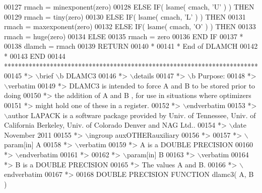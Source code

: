 \begin{DoxyCode}
00127          rmach = minexponent(zero)
00128       \textcolor{keywordflow}{ELSE} \textcolor{keywordflow}{IF}( lsame( cmach, \textcolor{stringliteral}{'U'} ) ) \textcolor{keywordflow}{THEN}
00129          rmach = tiny(zero)
00130       \textcolor{keywordflow}{ELSE} \textcolor{keywordflow}{IF}( lsame( cmach, \textcolor{stringliteral}{'L'} ) ) \textcolor{keywordflow}{THEN}
00131          rmach = maxexponent(zero)
00132       \textcolor{keywordflow}{ELSE} \textcolor{keywordflow}{IF}( lsame( cmach, \textcolor{stringliteral}{'O'} ) ) \textcolor{keywordflow}{THEN}
00133          rmach = huge(zero)
00134       \textcolor{keywordflow}{ELSE}
00135          rmach = zero
00136 \textcolor{keywordflow}{      END IF}
00137 \textcolor{comment}{*}
00138       dlamch = rmach
00139       \textcolor{keywordflow}{RETURN}
00140 \textcolor{comment}{*}
00141 \textcolor{comment}{*     End of DLAMCH}
00142 \textcolor{comment}{*}
00143 \textcolor{keyword}{      END}
00144 \textcolor{comment}{************************************************************************}
00145 \textcolor{comment}{*> \(\backslash\)brief \(\backslash\)b DLAMC3}
00146 \textcolor{comment}{*> \(\backslash\)details}
00147 \textcolor{comment}{*> \(\backslash\)b Purpose:}
00148 \textcolor{comment}{*> \(\backslash\)verbatim}
00149 \textcolor{comment}{*> DLAMC3  is intended to force  A  and  B  to be stored prior to doing}
00150 \textcolor{comment}{*> the addition of  A  and  B ,  for use in situations where optimizers}
00151 \textcolor{comment}{*> might hold one of these in a register.}
00152 \textcolor{comment}{*> \(\backslash\)endverbatim}
00153 \textcolor{comment}{*> \(\backslash\)author LAPACK is a software package provided by Univ. of Tennessee, Univ. of California Berkeley, Univ.
       of Colorado Denver and NAG Ltd..}
00154 \textcolor{comment}{*> \(\backslash\)date November 2011}
00155 \textcolor{comment}{*> \(\backslash\)ingroup auxOTHERauxiliary}
00156 \textcolor{comment}{*>}
00157 \textcolor{comment}{*> \(\backslash\)param[in] A}
00158 \textcolor{comment}{*> \(\backslash\)verbatim}
00159 \textcolor{comment}{*>          A is a DOUBLE PRECISION}
00160 \textcolor{comment}{*> \(\backslash\)endverbatim}
00161 \textcolor{comment}{*>}
00162 \textcolor{comment}{*> \(\backslash\)param[in] B}
00163 \textcolor{comment}{*> \(\backslash\)verbatim}
00164 \textcolor{comment}{*>          B is a DOUBLE PRECISION}
00165 \textcolor{comment}{*>          The values A and B.}
00166 \textcolor{comment}{*> \(\backslash\)endverbatim}
00167 \textcolor{comment}{*>}
00168 \textcolor{keyword}{      DOUBLE PRECISION }\textcolor{keyword}{FUNCTION }dlamc3( A, B )

\end{DoxyCode}
